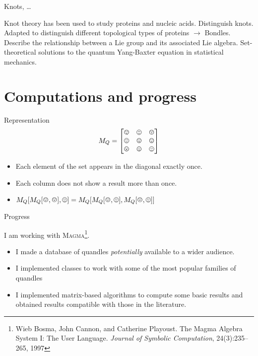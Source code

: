 \begin{frame}{Knots,  \dots}
\begin{figure}
    
    \label{fig:example}%
\end{figure}
\begin{minipage}{1\textwidth}
    Knot theory has been used to study proteins and nucleic acids.\newline
    Distinguish knots. \newline
    Adapted to distinguish different topological types of proteins $\to$ Bondles.\newline
     Describe the relationship between a Lie group and its associated Lie algebra. \newline
    Set-theoretical solutions to the quantum Yang-Baxter equation in statistical mechanics.
     
\end{minipage}

\end{frame}   

\section{Computations and progress}
\frame{\sectionpage}
\begin{frame}{Representation}
\[M_Q = \begin{bmatrix}
\smiley & \neutranieblack & \frownie \\
\neutranieblack & \frownie & \smiley \\
\frownie & \smiley & \neutranieblack
\end{bmatrix}\]

\begin{itemize}
    \item[1] Each element of the set appears in the diagonal exactly once. 
    \item[2] Each column does not show a result more than once.
    \item[3] $M_Q[M_Q[\smiley,\frownie], \neutranieblack] = M_Q[M_Q[\smiley, \neutranieblack], M_Q[\frownie, \neutranieblack]]$
\end{itemize}

\end{frame}

\begin{frame}{Progress}

I am working with \textsc{Magma}\footnote{Wieb Bosma, John Cannon, and Catherine Playoust.  The Magma Algebra System I: The User Language. \textit{Journal of Symbolic Computation}, 24(3):235–265, 1997}.
\begin{itemize}
    \item I made a database of quandles \emph{potentially} available to a wider audience. 
    \item I implemented classes to work with some of the most popular families of quandles
    \item I implemented matrix-based algorithms to compute some basic results and obtained results compatible with those in the literature.
\end{itemize}

\end{frame}

